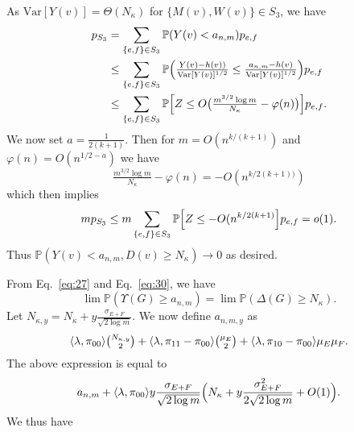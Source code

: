 \documentclass[10pt,journal,compsoc]{IEEEtran}
\theoremstyle{definition}
\begin{document}
\begin{IEEEproof}[Lemma~8]
\begin{IEEEproof}[Eq.~\eqref{eq:30}]
  As $\mathrm{Var}[Y(v)] = \Theta(N_\kappa)$ for $\{M(v), W(v)\} \in
  S_3$, we have
  \begin{equation}
    \label{eq:39}
    \begin{split}
      p_{S_3} &= \sum_{\{e,f\} \in S_3} \mathbb{P}( Y(v) < a_{n,m}) p_{e,f} 
      \\ &\leq \sum_{\{e,f\} \in S_3} \mathbb{P}\Bigl(\tfrac{Y(v) - h(v))}{\mathrm{Var}[Y(v)]^{1/2}} \leq \tfrac{a_{n,m} -
      h(v)}{\mathrm{Var}[Y(v)]^{1/2}}\Bigr)p_{e,f} \\
    &\leq \sum_{\{e,f\} \in S_3} \mathbb{P}\Bigl[Z \leq
    O\bigl(\tfrac{m^{3/2} \log m}{N_{\kappa}} - \varphi(n)\bigr)\Bigr]
    p_{e,f}.
    \end{split}
  \end{equation}
  We now set $a = \tfrac{1}{2(k+1)}$. Then for $m =
  O(n^{k/(k+1)})$ and $\varphi(n) = O(n^{1/2 - a})$ we have
  \begin{equation}
    \label{eq:41}
    \tfrac{m^{3/2} \log m}{N_\kappa} - \varphi(n) =
    -O(n^{k/2(k+1))})
  \end{equation}
  which then implies
  \begin{equation}
    \label{eq:44}
    m p_{S_3} \leq m \sum_{\{e,f\} \in S_3} \mathbb{P} \Bigl[Z \leq
    - O(n^{k/2(k+1)}\Bigr] p_{e,f} = o(1).
  \end{equation}
  Thus $\mathbb{P}(Y(v) < a_{n,m}, D(v) \geq
      N_{\kappa}) \rightarrow 0$ as desired.
\end{IEEEproof}
From Eq.~\eqref{eq:27} and Eq.~\eqref{eq:30}, we have
\begin{equation}
  \label{eq:40}
 \lim
\mathbb{P}(\Upsilon(G) \geq a_{n,m}) = \lim \mathbb{P}(\Delta(G) \geq
N_{\kappa}).
 \end{equation}
Let $N_{\kappa,y} = N_\kappa + y \tfrac{\sigma_{E+F}}{\sqrt{2
    \log{m}}}$. We now define $a_{n,m,y}$ as 
\begin{equation*}
  \langle \lambda, \pi_{00} \rangle
    \tbinom{N_{\kappa,y}}{2} +
  \langle \lambda, \pi_{11} - \pi_{00} \rangle \tbinom{\mu_E}{2}  +
  \langle \lambda, \pi_{10} - \pi_{00} \rangle \mu_E \mu_F.
\end{equation*}
The above expression is equal to 
\begin{equation}
  \label{eq:57}
 a_{n,m} + \langle \lambda, \pi_{00} \rangle y
  \frac{\sigma_{E+F}}{\sqrt{2 \log m}} \Bigl(N_{\kappa} + y
  \frac{\sigma_{E+F}^{2}}{2 \sqrt{2 \log{m}}} + O(1) \Bigr).
\end{equation}
We thus have
\begin{equation*}

\end{equation*}
\end{IEEEproof}
\end{document}
